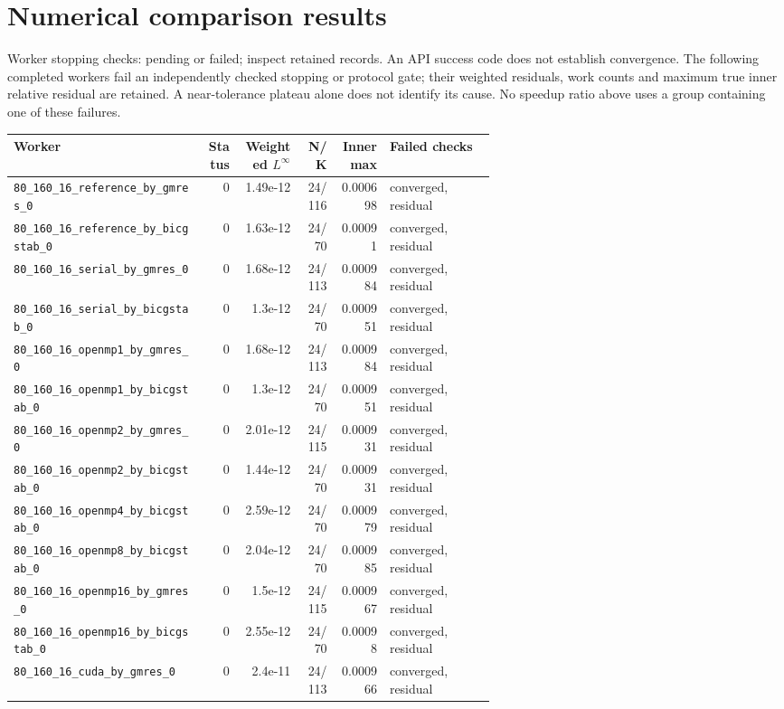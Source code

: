 \documentclass[11pt]{article}
\begin{document}
\section{Numerical comparison results}
Worker stopping checks: pending or failed; inspect retained records.
An API success code does not establish convergence. The following
completed workers fail an independently checked stopping or protocol gate;
their weighted residuals, work counts and maximum true inner relative residual
are retained. A near-tolerance plateau alone does not identify its cause.
No speedup ratio above uses a group containing one of these failures.
\scriptsize\begin{longtable}{p{0.40\linewidth}rrrrp{0.22\linewidth}}
\toprule Worker & Status & Weighted $L^\infty$ & N/K & Inner max & Failed checks\\
\midrule\endhead
\nolinkurl{80_160_16_reference_by_gmres_0} & 0 & 1.49e-12 & 24/116 & 0.000698 & converged, residual\\
\nolinkurl{80_160_16_reference_by_bicgstab_0} & 0 & 1.63e-12 & 24/70 & 0.00091 & converged, residual\\
\nolinkurl{80_160_16_serial_by_gmres_0} & 0 & 1.68e-12 & 24/113 & 0.000984 & converged, residual\\
\nolinkurl{80_160_16_serial_by_bicgstab_0} & 0 & 1.3e-12 & 24/70 & 0.000951 & converged, residual\\
\nolinkurl{80_160_16_openmp1_by_gmres_0} & 0 & 1.68e-12 & 24/113 & 0.000984 & converged, residual\\
\nolinkurl{80_160_16_openmp1_by_bicgstab_0} & 0 & 1.3e-12 & 24/70 & 0.000951 & converged, residual\\
\nolinkurl{80_160_16_openmp2_by_gmres_0} & 0 & 2.01e-12 & 24/115 & 0.000931 & converged, residual\\
\nolinkurl{80_160_16_openmp2_by_bicgstab_0} & 0 & 1.44e-12 & 24/70 & 0.000931 & converged, residual\\
\nolinkurl{80_160_16_openmp4_by_bicgstab_0} & 0 & 2.59e-12 & 24/70 & 0.000979 & converged, residual\\
\nolinkurl{80_160_16_openmp8_by_bicgstab_0} & 0 & 2.04e-12 & 24/70 & 0.000985 & converged, residual\\
\nolinkurl{80_160_16_openmp16_by_gmres_0} & 0 & 1.5e-12 & 24/115 & 0.000967 & converged, residual\\
\nolinkurl{80_160_16_openmp16_by_bicgstab_0} & 0 & 2.55e-12 & 24/70 & 0.00098 & converged, residual\\
\nolinkurl{80_160_16_cuda_by_gmres_0} & 0 & 2.4e-11 & 24/113 & 0.000966 & converged, residual\\

\end{longtable}
\end{document}
